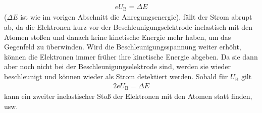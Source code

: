 \begin{align}\label{eq:energie2}
	eU_\text{B} = \Delta E 
\end{align}
($\Delta E$ ist wie im vorigen Abschnitt die Anregungsenergie), fällt der Strom abrupt ab, da die Elektronen kurz vor der Beschleunigungselektrode inelastisch mit den Atomen stoßen und danach keine kinetische Energie mehr haben, um das Gegenfeld zu überwinden. Wird die Beschleunigungsspannung weiter erhöht, können die Elektronen immer früher ihre kinetische Energie abgeben. Da sie dann aber noch nicht bei der Beschleunigungselektrode sind, werden sie wieder beschleunigt und können wieder als Strom detektiert werden. Sobald für $U_\text{B}$ gilt
\begin{align}
	2eU_\text{B} = \Delta E
\end{align}
kann ein zweiter inelastischer Stoß der Elektronen mit den Atomen statt finden, usw.